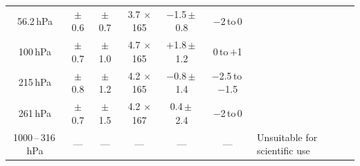 \documentclass[11pt,draft]{report}
\begin{document}
\begin{table}
\begin{minipage}{\textheight}
\begin{tabular}{ccccccl}
56.2\,hPa          & $\pm$0.6  & $\pm$0.7   & 3.7    $\times$ 165 & $-$1.5\,$\pm$\,0.8    & $-$2\,to\,0 & \\
100\,hPa           & $\pm$0.7  & $\pm$1.0   & 4.7    $\times$ 165 & $+$1.8\,$\pm$\,1.2    &  0\,to\,$+$1  & \\
215\,hPa           & $\pm$0.8  & $\pm$1.2   & 4.2    $\times$ 165 & $-$0.8\,$\pm$\,1.4 & $-$2.5\,to\,$-$1.5   & \\
261\,hPa           & $\pm$0.7  & $\pm$1.5   & 4.2    $\times$ 167 & 0.4\,$\pm$\,2.4      & $-$2\,to\,0   & \\
1000\,--\,316\,hPa & ---       & ---      & ---              & ---           & --- & Unsuitable for scientific use\\
\bottomrule
\end{tabular}
\end{minipage}
\end{table}
\end{document}
